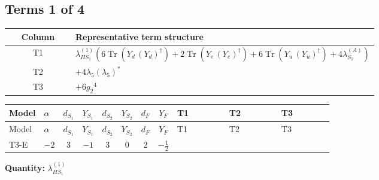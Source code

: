 \documentclass[8pt]{article}
\begin{document}
\begin{landscape}
\subsection*{Terms 1 of 4}
\begin{center}
\begin{tabular}{@{}c >{\raggedright\arraybackslash}p{0.82\linewidth}@{}}
\toprule
Column & Representative term structure \\
\midrule
T1 & \(\displaystyle {\lambda_{HS_1}^{(1)}} (6 \operatorname{Tr}\!\left({Y_d}\,\left({Y_d}\right)^{\dagger}\right)+2 \operatorname{Tr}\!\left({Y_e}\,\left({Y_e}\right)^{\dagger}\right)+6 \operatorname{Tr}\!\left({Y_u}\,\left({Y_u}\right)^{\dagger}\right)+4 {\lambda_{S_1}^{(A)}})\) \\
\midrule
T2 & \(\displaystyle +4 {\lambda_5} \left({\lambda_5}\right)^{*}\) \\
\midrule
T3 & \(\displaystyle +6 {g_2}^4\) \\
\midrule
\bottomrule
\end{tabular}
\end{center}
\smallskip
\tiny
\begin{longtable}{@{}llcccccc >{\raggedright\arraybackslash}p{0.21\linewidth} >{\raggedright\arraybackslash}p{0.21\linewidth} >{\raggedright\arraybackslash}p{0.21\linewidth}@{}}
\toprule
Model & $\alpha$ & $d_{S_1}$ & $Y_{S_1}$ & $d_{S_2}$ & $Y_{S_2}$ & $d_F$ & $Y_F$ & T1 & T2 & T3 \\
\midrule
\endfirsthead
\toprule
Model & $\alpha$ & $d_{S_1}$ & $Y_{S_1}$ & $d_{S_2}$ & $Y_{S_2}$ & $d_F$ & $Y_F$ & T1 & T2 & T3 \\
\midrule
\endhead
T3-E & $-2$ & $3$ & $-1$ & $3$ & $0$ & $2$ & $-\frac{1}{2}$ & \scriptsize\adjustbox{max width=\linewidth}{$\begin{gathered} {\lambda_{HS_1}^{(1)}} (6 \operatorname{Tr}\!\left({Y_d}\,\left({Y_d}\right)^{\dagger}\right)+2 \operatorname{Tr}\!\left({Y_e}\,\left({Y_e}\right)^{\dagger}\right)+6 \operatorname{Tr}\!\left({Y_u}\,\left({Y_u}\right)^{\dagger}\right)+4 {\lambda_{S_1}^{(A)}})\end{gathered}$} & \scriptsize\adjustbox{max width=\linewidth}{$\begin{gathered} +4 {\lambda_5} \left({\lambda_5}\right)^{*}\end{gathered}$} & \scriptsize\adjustbox{max width=\linewidth}{$\begin{gathered} +6 {g_2}^4\end{gathered}$} \\
\midrule
\bottomrule
\end{longtable}
\clearpage
\noindent\textbf{Quantity: }$\lambda_{HS_1}^{(1)}$\par\smallskip

\end{landscape}
\end{document}
